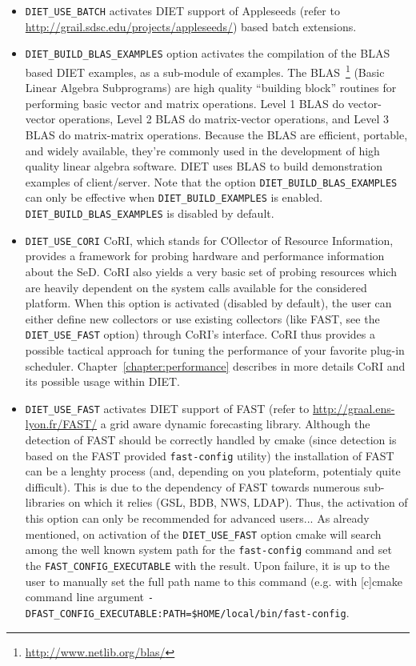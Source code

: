 \begin{itemize}
\item
  \verb+DIET_USE_BATCH+ activates DIET support of Appleseeds (refer to
  \url{http://grail.sdsc.edu/projects/appleseeds/}) based batch
  extensions.

\item
  \verb+DIET_BUILD_BLAS_EXAMPLES+ option activates the compilation of
  the BLAS based DIET examples, as a sub-module of examples.
  The BLAS~\footnote{\url{http://www.netlib.org/blas/}} (Basic Linear
  Algebra Subprograms) are high quality ``building block'' routines for
  performing basic vector and matrix operations.
  Level 1 BLAS do vector-vector operations, Level 2 BLAS do matrix-vector
  operations, and Level 3 BLAS do matrix-matrix operations.
  Because the BLAS are efficient, portable, and widely available,
  they're commonly used in the development of high quality linear algebra
  software.
  DIET uses BLAS to build demonstration examples of client/server.
  Note that the option \verb+DIET_BUILD_BLAS_EXAMPLES+ can only be
  effective when \verb+DIET_BUILD_EXAMPLES+ is enabled.
  \verb+DIET_BUILD_BLAS_EXAMPLES+ is disabled by default.

\item
  \verb+DIET_USE_CORI+ CoRI, which stands for COllector of Resource
  Information, provides a framework for probing hardware and performance
  information about the SeD.
  CoRI also yields a very basic set of probing resources which are
  heavily dependent on the system calls available for the considered platform.
  When this option is activated (disabled by default), the user can either
  define new collectors or use existing collectors (like FAST, see the
  \verb+DIET_USE_FAST+ option) through CoRI's interface.
  CoRI thus provides a possible tactical approach for tuning the performance
  of your favorite plug-in scheduler.
  Chapter~\ref{chapter:performance} describes in more details CoRI and its
  possible usage within DIET.

\item
  \verb+DIET_USE_FAST+ activates DIET support of FAST (refer to
  \url{http://graal.ens-lyon.fr/FAST/} a grid aware dynamic forecasting
  library.
  Although the detection of FAST should be correctly handled by cmake
  (since detection is based on the FAST provided \verb+fast-config+ utility)
  the installation of FAST can be a lenghty process (and, depending on you
  plateform, potentialy quite difficult).
  This is due to the dependency of FAST towards numerous sub-libraries on
  which it relies (GSL, BDB, NWS, LDAP).
  Thus, the activation of this option can only be recommended for advanced
  users...
  As already mentioned, on activation of the \verb+DIET_USE_FAST+ option
  cmake will search among the well known system path for the
  \verb+fast-config+ command and set the \verb+FAST_CONFIG_EXECUTABLE+ 
  with the result. Upon failure, it is up to the user to manually set the
  full path name to this command (e.g. with [c]cmake command line argument
  \verb+-DFAST_CONFIG_EXECUTABLE:PATH=$HOME/local/bin/fast-config+.


\end{itemize}

